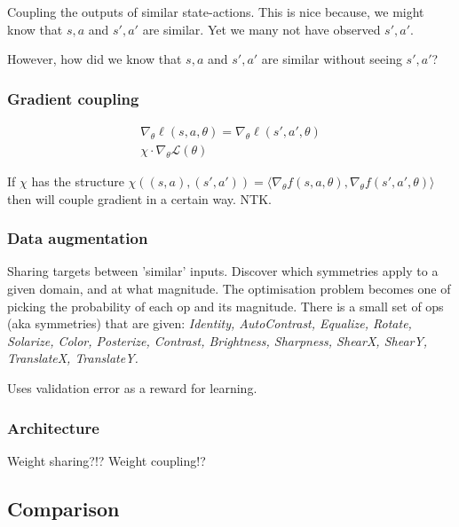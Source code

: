 Coupling the outputs of similar state-actions. This is nice because, we might know
that $s, a$ and $s', a'$ are similar. Yet we many not have observed $s', a'$.


However, how did we know that $s, a$ and $s', a'$ are similar without seeing $s', a'$?

\subsubsection{Gradient coupling}

\begin{align*}
\nabla_{\theta} \ell(s, a, \theta) = \nabla_{\theta} \ell(s', a', \theta) \\
\chi \cdot \nabla_{\theta} \mathcal L(\theta)
\end{align*}

If $\chi$ has the structure $\chi((s, a), (s', a')) = \langle \nabla_{\theta}f(s, a, \theta), \nabla_{\theta} f(s', a', \theta) \rangle$ then will couple gradient in a certain way. NTK.

\subsubsection{Data augmentation}

Sharing targets between 'similar' inputs.
\cite{Ho2019a, Lim2019, Cubuk2018, Cubuk2019}
Discover which symmetries apply to a given domain, and at what magnitude.
The optimisation problem becomes one of picking the probability of each op and its magnitude.
There is a small set of ops (aka symmetries) that are given:
\textit{Identity, AutoContrast, Equalize, Rotate, Solarize, Color, Posterize, Contrast,
Brightness, Sharpness, ShearX, ShearY, TranslateX, TranslateY.}

Uses validation error as a reward for learning.

\subsubsection{Architecture}

Weight sharing?!? Weight coupling!?
\cite{Ravanbakhsh2017a,Abdolhosseini}
\cite{Anselmi2019}


\subsection{Comparison}

